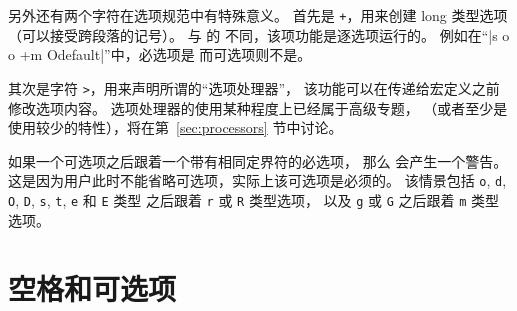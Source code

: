 \documentclass{l3doc}
\begin{document}
%
另外还有两个字符在选项规范中有特殊意义。
首先是 \texttt{+}，用来创建 long 类型选项（可以接受跨段落的记号）。
与 \LaTeXe{} 的  不同，该项功能是逐选项运行的。
例如在“|s o o +m O{default}|”中，必选项是  而可选项则不是。

%
其次是字符 \texttt{>}，用来声明所谓的“选项处理器”，
该功能可以在传递给宏定义之前修改选项内容。
选项处理器的使用某种程度上已经属于高级专题，
（或者至少是使用较少的特性），将在第~\ref{sec:processors} 节中讨论。

%
如果一个可选项之后跟着一个带有相同定界符的必选项，
那么  会产生一个警告。
这是因为用户此时不能省略可选项，实际上该可选项是必须的。
该情景包括 \texttt{o}, \texttt{d}, \texttt{O}, \texttt{D}, \texttt{s}, \texttt{t}, \texttt{e} 和 \texttt{E} 类型
之后跟着 \texttt{r} 或 \texttt{R} 类型选项，
以及 \texttt{g} 或 \texttt{G} 之后跟着 \texttt{m} 类型选项。

%
\section{空格和可选项}
\end{document}
